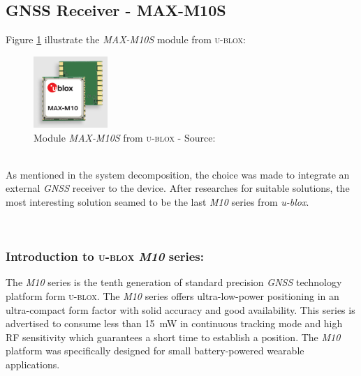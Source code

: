\documentclass[report.tex]{subfiles}
\begin{document}
\subsection{GNSS Receiver - MAX-M10S}

Figure \ref{fig:maxm10s_pict} illustrate the \textit{MAX-M10S} module from \textsc{u-blox}:

\begin{figure}[H]
	\centering
	\includegraphics[width=0.25\textwidth]{Include/Figure/comp/maxm10s_pict.png}
	\caption{Module \textit{MAX-M10S} from \textsc{u-blox} - Source: \cite{MAXM10S}}
	\label{fig:maxm10s_pict}
\end{figure}
\;\\[-20pt]
As mentioned in the system decomposition, the choice was made to integrate an external \textit{GNSS} receiver to the device. After researches for suitable solutions, the most interesting solution seamed to be the last \textit{M10} series from \textit{u-blox}.

\;\\[-40pt]
\subsubsection{Introduction to \textsc{u-blox} \textit{M10} series:}

The \textit{M10}\cite{ublox_m10} series is the tenth generation of standard precision \textit{GNSS} technology platform form \textsc{u-blox}. The \textit{M10} series offers ultra-low-power positioning in an ultra-compact form factor with solid accuracy and good availability. This series is advertised to consume less than \SI{15}{\milli\watt} in continuous tracking mode and high RF sensitivity which guarantees a short time to establish a position. The \textit{M10} platform was specifically designed for small battery-powered wearable applications.\\
\end{document}
